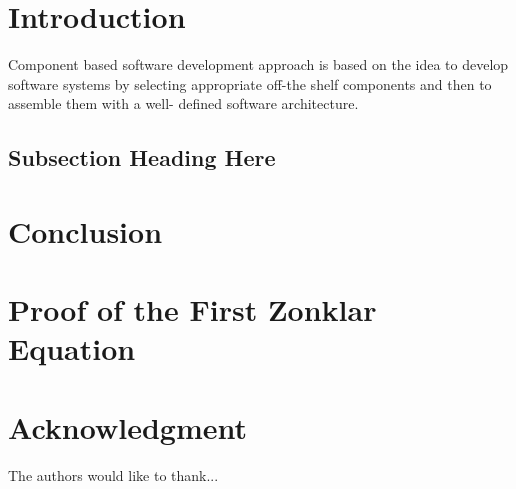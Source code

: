 \documentclass[conference]{IEEEtran}
\begin{document}
\section{Introduction}
Component based software development approach is based on
the idea to develop software systems by selecting appropriate
off-the shelf components and then to assemble them with a well-
defined software architecture. \cite{kaur2010component}


\subsection{Subsection Heading Here}
\blindtext


\section{Conclusion}
\blindtext


\appendices
\section{Proof of the First Zonklar Equation}
\blindtext

\section*{Acknowledgment}
The authors would like to thank...

\ifCLASSOPTIONcaptionsoff
  \newpage
\fi




%
%



\end{document}
